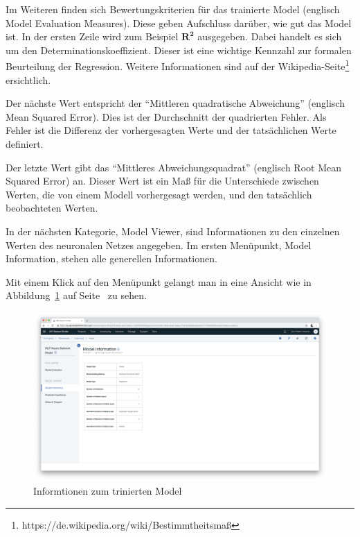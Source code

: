 Im Weiteren finden sich Bewertungskriterien für das trainierte Model (englisch Model Evaluation Measures). Diese geben
Aufschluss darüber, wie gut das Model ist. In der ersten Zeile wird zum Beispiel $\mathbf{R^2}$ ausgegeben.  Dabei
handelt es sich um den Determinationskoeffizient. Dieser ist eine wichtige Kennzahl zur formalen Beurteilung der
Regression. Weitere Informationen sind auf der Wikipedia-Seite\footnote{https://de.wikipedia.org/wiki/Bestimmtheitsmaß}
ersichtlich.

Der nächste Wert entspricht der \enquote{Mittleren quadratische Abweichung} (englisch Mean Squared Error). Dies ist der
Durchschnitt der quadrierten Fehler. Als Fehler ist die Differenz der vorhergesagten Werte und der tatsächlichen Werte
definiert.

Der letzte Wert gibt das \enquote{Mittleres Abweichungsquadrat} (englisch Root Mean Squared Error) an. Dieser Wert ist
ein Maß für die Unterschiede zwischen Werten, die von einem Modell vorhergesagt werden, und den tatsächlich beobachteten
Werten.

In der nächsten Kategorie, Model Viewer, sind Informationen zu den einzelnen Werten des neuronalen Netzes angegeben.
Im ersten Menüpunkt, Model Information, stehen alle generellen Informationen.

Mit einem Klick auf den Menüpunkt gelangt man in eine Ansicht wie in Abbildung~\ref{fig:umsetzung_model_information}
auf Seite~\pageref{fig:umsetzung_model_information} zu sehen.

\begin{figure}[h]
    \centering
    \includegraphics[width=\textwidth]{images/kapitel_3/model_information.png}
    \caption{Informtionen zum trinierten Model}
    \label{fig:umsetzung_model_information}
\end{figure}

